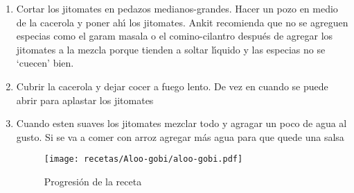 \begin{enumerate}
\item Cortar los jitomates en pedazos medianos-grandes. Hacer un pozo en medio de la cacerola y poner ah\'{\i} los jitomates. Ankit recomienda que no se agreguen especias como el garam masala o el comino-cilantro despu\'es de agregar los jitomates a la mezcla porque tienden a soltar l\'{\i}quido y las especias no se `cuecen' bien. 
\item Cubrir la cacerola y dejar cocer a fuego lento. De vez en cuando se puede abrir para aplastar los jitomates
\item Cuando esten suaves los jitomates mezclar todo y agragar un poco de agua al gusto. Si se va a comer con arroz agregar m\'as agua para que quede una salsa 

\begin{figure}[H]
\centering
\texttt{[image: recetas/Aloo-gobi/aloo-gobi.pdf]}
\caption{Progresi\'on de la receta}
\label{fig:aloo-gobi}
\end{figure}

\end{enumerate}